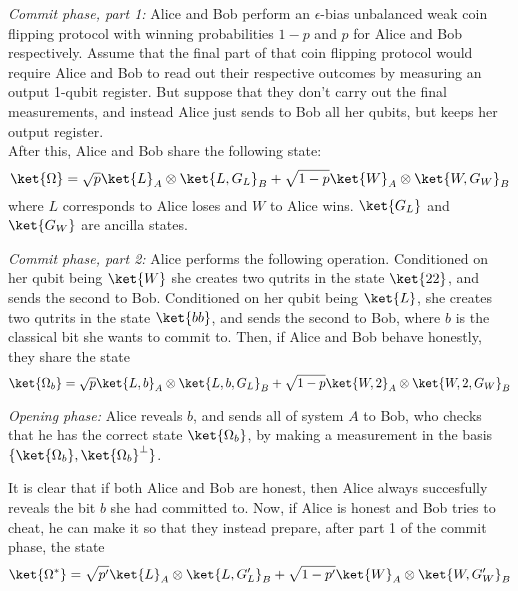 \begin{exercises}
\begin{protocolEnumerate}
\item \textit{Commit phase, part 1:} Alice and Bob perform an $\epsilon$-bias unbalanced weak coin flipping protocol with winning probabilities $1-p$ and $p$ for Alice and Bob respectively. Assume that the final part of that coin flipping protocol would require Alice and Bob to read out their respective outcomes by measuring an output 1-qubit register. But suppose that they don't carry out the final measurements, and instead Alice just sends to Bob all her qubits, but keeps her output register. \\
After this, Alice and Bob share the following state:\\
\begin{equation*}
 \ket{\Omega} =  \sqrt{p} \ket{L}_A \otimes \ket{L,G_L}_B + \sqrt{1-p} \ket{W}_A \otimes \ket{W, G_W}_B
\end{equation*}
where $L$ corresponds to Alice loses and $W$ to Alice wins.  $\ket{G_L}$ and $\ket{G_W}$ are ancilla states.\\
\item \textit{Commit phase, part 2:} Alice performs the following operation. Conditioned on her qubit being $\ket{W}$ she creates two qutrits in the state $\ket{22}$, and sends the second to Bob. Conditioned on her qubit being $\ket{L}$, she creates two qutrits in the state $\ket{bb}$, and sends the second to Bob, where $b$ is the classical bit she wants to commit to. Then, if Alice and Bob behave honestly, they share the state
\begin{equation*}
\ket{\Omega_b} =  \sqrt{p} \ket{L,b}_A \otimes \ket{L,b,G_L}_B + \sqrt{1-p} \ket{W,2}_A \otimes \ket{W,2,G_W}_B
\end{equation*}
\item \textit{Opening phase:} Alice reveals $b$, and sends all of system $A$ to Bob, who checks that he has the correct state $\ket{\Omega_b}$, by making a measurement in the basis $\{ \ket{\Omega_b},  \ket{\Omega_b}^{\perp}\}$.
\end{protocolEnumerate}
It is clear that if both Alice and Bob are honest, then Alice always succesfully reveals the bit $b$ she had committed to. Now, if Alice is honest and Bob tries to cheat, he can make it so that they instead prepare, after part 1 of the commit phase, the state
\begin{equation*}
\ket{\Omega^*} =  \sqrt{p'} \ket{L}_A \otimes \ket{L, G'_L}_B + \sqrt{1-p'} \ket{W}_A \otimes \ket{W, G'_W}_B
\end{equation*}

\end{exercises}
